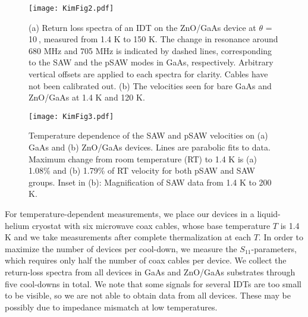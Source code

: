 \documentclass[aps,prb,amsmath,amssymb,footinbib,showpacs,superscriptaddress]{revtex4-1}%
\begin{document}
\begin{figure}
\texttt{[image: KimFig2.pdf]}
\caption{(a) Return loss spectra of an IDT on the ZnO/GaAs device at $\theta$ = 10\textdegree$\>$, measured from 1.4 K to 150 K. The change in resonance around 680 MHz and 705 MHz is indicated by dashed lines, corresponding to the SAW and the pSAW modes in GaAs, respectively. Arbitrary vertical offsets are applied to each spectra for clarity.  Cables have not been calibrated out. (b) The velocities seen for bare GaAs and ZnO/GaAs at 1.4 K and 120 K.}
\label{fig:fig2}
\end{figure}

\begin{figure}[htbp]
\texttt{[image: KimFig3.pdf]}
\caption{Temperature dependence of the SAW and pSAW velocities on (a) GaAs and (b) ZnO/GaAs devices. Lines are parabolic fits to data. Maximum change from room temperature (RT) to 1.4 K is (a) 1.08\% and (b) 1.79\% of RT velocity for both pSAW and SAW groups. Inset in (b): Magnification of SAW data from 1.4 K to 200 K.}
\label{fig:fig3}
\end{figure}

For temperature-dependent measurements, we place our devices in a liquid-helium cryostat with six microwave coax cables, whose base temperature $T$ is 1.4 K and we take measurements after complete thermalization at each $T$. In order to maximize the number of devices per cool-down, we measure the $S_{11}$-parameters, which requires only half the number of coax cables per device. We collect the return-loss spectra from all devices in GaAs and ZnO/GaAs substrates through five cool-downs in total. We note that some signals for several IDTs are too small to be visible, so we are not able to obtain data from all devices. These may be possibly due to impedance mismatch at low temperatures. 
\end{document}
